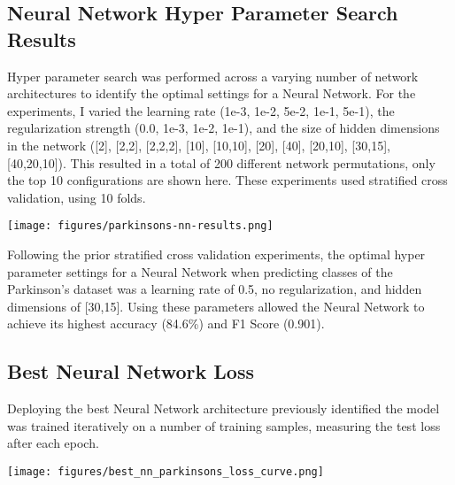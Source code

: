 \documentclass[letterpaper]{article}
\begin{document}
\subsection{Neural Network Hyper Parameter Search Results}

    Hyper parameter search was performed across a varying number of network architectures to identify the optimal settings for a Neural Network. For the experiments, I varied the learning rate (1e-3, 1e-2, 5e-2, 1e-1, 5e-1), the regularization strength (0.0, 1e-3, 1e-2, 1e-1), and the size of hidden dimensions in the network ([2], [2,2], [2,2,2], [10], [10,10], [20], [40], [20,10], [30,15], [40,20,10]). This resulted in a total of 200 different network permutations, only the top 10 configurations are shown here. These experiments used stratified cross validation, using 10 folds.


     \vspace{0.2in}
        \begin{minipage}{\linewidth}
            \centering
            \texttt{[image: figures/parkinsons-nn-results.png]}
        \end{minipage}
    \vspace{0.1in}
    
Following the prior stratified cross validation experiments, the optimal hyper parameter settings for  a Neural Network when predicting classes of the Parkinson's dataset was a learning rate of 0.5, no regularization, and hidden dimensions of [30,15]. Using these parameters allowed the Neural Network to achieve its highest accuracy (84.6\%) and F1 Score (0.901).

\clearpage
\subsection*{Best Neural Network Loss}

Deploying the best Neural Network architecture previously identified the model was trained iteratively on a number of training samples, measuring the test loss after each epoch.

\vspace{0.2in}
        \begin{minipage}{\linewidth}
            \centering
            \texttt{[image: figures/best\_nn\_parkinsons\_loss\_curve.png]}
        \end{minipage}
    \vspace{0.1in}
\end{document}
